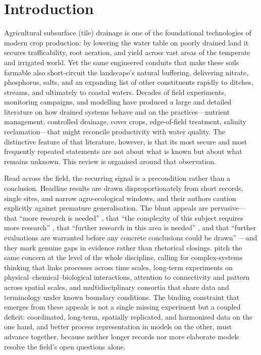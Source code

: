 \documentclass[11pt]{article}
\begin{document}
\section*{Introduction}

Agricultural subsurface (tile) drainage is one of the foundational
technologies of modern crop production: by lowering the water table on
poorly drained land it secures trafficability, root aeration, and yield
across vast areas of the temperate and irrigated world. Yet the same
engineered conduits that make these soils farmable also short-circuit the
landscape's natural buffering, delivering nitrate, phosphorus, salts, and
an expanding list of other constituents rapidly to ditches, streams, and
ultimately to coastal waters. Decades of field experiments, monitoring
campaigns, and modelling have produced a large and detailed literature on
how drained systems behave and on the practices---nutrient management,
controlled drainage, cover crops, edge-of-field treatment, salinity
reclamation---that might reconcile productivity with water quality. The
distinctive feature of that literature, however, is that its most secure
and most frequently repeated statements are not about what is known but
about what remains unknown. This review is organised around that
observation.

Read across the field, the recurring signal is a precondition rather than
a conclusion. Headline results are drawn disproportionately from short
records, single sites, and narrow agro-ecological windows, and their
authors caution explicitly against premature generalisation. The blunt
appeals are pervasive---that ``more research is needed''
\parencite{SHALIT1995}, that ``the complexity of this subject requires
more research'' \parencite{Malone2014}, that ``further research in this
area is needed'' \parencite{Woo2023}, and that ``further evaluations are
warranted before any concrete conclusions could be drawn''
\parencite{GUPTA1993}---and they mark genuine gaps in evidence rather than
rhetorical closings. \textcite{Rogger2017} pitch the same concern at the
level of the whole discipline, calling for complex-systems thinking that
links processes across time scales, long-term experiments on
physical--chemical--biological interactions, attention to connectivity and
pattern across spatial scales, and multidisciplinary consortia that share
data and terminology under known boundary conditions. The binding
constraint that emerges from these appeals is not a single missing
experiment but a coupled deficit: coordinated, long-term, spatially
replicated, and harmonised data on the one hand, and better process
representation in models on the other, must advance together, because
neither longer records nor more elaborate models resolve the field's open
questions alone.
\end{document}

